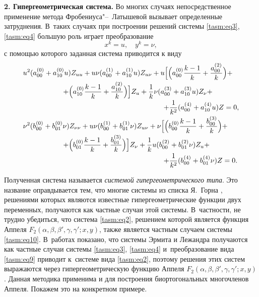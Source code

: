 \textbf{2. Гипергеометрическая система.} 
Во многих случаях непосредственное применение метода Фробениуса"--~Латышевой вызывает определенные затруднения. 
В~таких случаях при построении решений системы \eqref{tasm:eq3}, \eqref{tasm:eq4} большую роль играет преобразование
\begin{equation}
x^{k}=u,\quad  y^{k}=\nu ,
\label{tasm:eq9}
\end{equation}
с помощью которого заданная система приводится к виду
\begin{equation}
\begin{array}{l}
\displaystyle 
u^{2}(a^{(0)}_{00}+a^{(0)}_{10}u)    Z_{uu}+u\nu(a^{(1)}_{00}+
a^{(1)}_{10}u)    Z_{u\nu}+u
\Bigl[\Bigl(a^{(0)}_{00} \frac{k-1}{k}+
\frac{a^{(2)}_{00}}{k}\Bigr)+\\[0.2cm]
\hspace{2cm}
\displaystyle 
+\Bigl(a^{(0)}_{10}\frac{k-1}{k}+ \frac{a^{(2)}_{10}}{k}\Bigr)\Bigr]    Z_{u}+ \frac{1}{k}   
\nu    (a^{(3)}_{00}+a^{(3)}_{10}u)    Z_{\nu}+\\[0.2cm]
\hspace{7cm}
\displaystyle 
+\displaystyle \frac{1}{k^{2}}    (a^{(4)}_{00}+a^{(4)}_{10}u)    Z=0, 
\\[0.2cm]
\displaystyle 
\nu^{2}(b^{(0)}_{00}+b^{(0)}_{01}\nu)   Z_{\nu\nu}+u\nu(b^{(1)}_{00}+ b^{(1)}_{01}\nu)   Z_{u\nu}+
\nu\Bigl[\Bigl(b^{(0)}_{00}  \frac{k-1}{k}+ \frac{b^{(3)}_{00}}{k}\Bigr)+
\\[0.2cm]
\hspace{2cm}
\displaystyle 
+\Bigl(b^{(0)}_{01} \frac{k-1}{k}+ \frac{b^{(3)}_{01}}{k}\Bigr)\Bigr]    Z_{\nu}+ 
\frac{1}{k}    u    (b^{(2)}_{00}+b^{(2)}_{01}\nu)   Z_{u}+
\\[0.2cm]
\hspace{7cm}
\displaystyle 
+ \frac{1}{k^{2}}   (b^{(4)}_{00}+b^{(4)}_{01}\nu)    Z=0.
\end{array}
\label{tasm:eq10}
\end{equation}

Полученная система называется \emph{системой гипергеометрического типа}. 
Это название оправдывается тем, что многие системы из списка Я.~Горна \cite{tasm:6}, решениями которых являются известные гипергеометрические функции двух переменных, получаются как частные случаи этой системы. 
В~частности, не трудно убедиться, что система \eqref{tasm:eq2}, решением которой является функция Аппеля $F_{2}(\alpha, \beta, \beta', \gamma, \gamma'; x, y)$, также является частным случаем системы \eqref{tasm:eq10}. 
В~работах \cite{tasm:5, tasm:7} показано, что системы Эрмита и Лежандра получаются как частные случаи системы \eqref{tasm:eq3}, \eqref{tasm:eq4} и~преобразование вида \eqref{tasm:eq9} приводит к~системе вида \eqref{tasm:eq2}, поэтому решения этих систем выражаются через гипергеометрическую функцию Аппеля $F_{2}(\alpha, \beta, \beta', \gamma, \gamma'; x, y)$. 
Данная методика применима и для построения биортогональных многочленов Аппеля.
Покажем это на конкретном примере.

